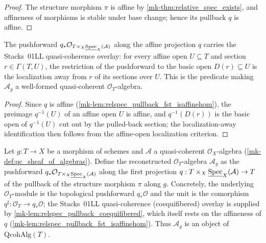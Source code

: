 \begin{proof}
  The structure morphism \(\pi\) is affine by \ref{mk-thm:relative_spec_exists}, and
  affineness of morphisms is stable under base change; hence its pullback \(q\) is
  affine.
\end{proof}

\begin{lemma}
  \label{mk-lem:relspec_pullback_coequifibered}

  The pushforward \(q_* \mathcal{O}_{T \times_X \underline{\operatorname{Spec}}_X(\mathcal{A})}\)
  along the affine projection \(q\) carries the Stacks~01LL quasi-coherence overlay:
  for every affine open \(U \subseteq T\) and section \(r \in \Gamma(T, U)\), the
  restriction of the pushforward to the basic open \(D(r) \subseteq U\) is the
  localization away from \(r\) of its sections over \(U\). This is the predicate making
  \(\mathcal{A}_g\) a well-formed quasi-coherent \(\mathcal{O}_T\)-algebra.
\end{lemma}

\begin{proof}
  Since \(q\) is affine (\ref{mk-lem:relspec_pullback_fst_isaffinehom}), the preimage
  \(q^{-1}(U)\) of an affine open \(U\) is affine, and \(q^{-1}(D(r))\) is the basic open
  of \(q^{-1}(U)\) cut out by the pulled-back section; the localization-away
  identification then follows from the affine-open localization criterion.
\end{proof}

\begin{definition}
  \label{mk-def:relspec_qcoh_pullback}

  Let \(g : T \to X\) be a morphism of schemes and \(\mathcal{A}\) a quasi-coherent
  \(\mathcal{O}_X\)-algebra (\ref{mk-def:qc_sheaf_of_algebras}). Define the reconstructed
  \(\mathcal{O}_T\)-algebra \(\mathcal{A}_g\) as the pushforward
  \(q_* \mathcal{O}_{T \times_X \underline{\operatorname{Spec}}_X(\mathcal{A})}\) along the first
  projection \(q : T \times_X \underline{\operatorname{Spec}}_X(\mathcal{A}) \to T\) of the pullback of
  the structure morphism \(\pi\) along \(g\). Concretely, the underlying
  \(\mathcal{O}_T\)-module is the topological pushforward \(q_* \mathcal{O}\) and the unit
  is the comorphism \(q^\sharp : \mathcal{O}_T \to q_* \mathcal{O}\); the Stacks~01LL
  quasi-coherence (coequifibered) overlay is supplied by
  \ref{mk-lem:relspec_pullback_coequifibered}, which itself rests on the affineness of \(q\)
  (\ref{mk-lem:relspec_pullback_fst_isaffinehom}). Thus \(\mathcal{A}_g\) is an object of
  \(\mathrm{QcohAlg}(T)\).
\end{definition}

